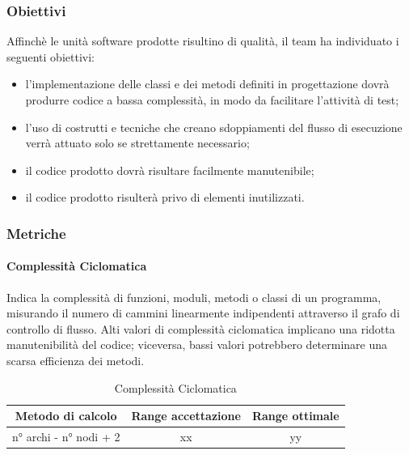 		\subsubsection{Obiettivi}
		Affinchè le unità software prodotte risultino di qualità, il team ha individuato i seguenti obiettivi:
		\begin{itemize}
			\item l’implementazione delle classi e dei metodi definiti in progettazione dovrà produrre codice a bassa complessità, in modo da facilitare l'attività di test;
			\item l’uso di costrutti e tecniche che creano sdoppiamenti del flusso di esecuzione verrà attuato solo se strettamente necessario;
			\item il codice prodotto dovrà risultare facilmente manutenibile;
			\item il codice prodotto risulterà privo di elementi inutilizzati.
		\end{itemize}
		
		\subsubsection{Metriche}
			\paragraph{Complessità Ciclomatica}
			Indica la complessità di funzioni, moduli, metodi o classi di un programma, misurando il numero
			di cammini linearmente indipendenti attraverso il grafo di controllo di flusso.
			Alti valori di complessità ciclomatica implicano una ridotta manutenibilità del codice; viceversa, bassi valori potrebbero determinare una scarsa efficienza dei metodi.
			\begin{table}[H]
				\begin{center}
					\begin{tabular}{|c|c|c|}
						\hline
						\textbf{Metodo di calcolo} & \textbf{Range accettazione} & \textbf{Range ottimale} \\
						\hline
						n° archi - n° nodi + 2 & xx  & yy \\
						\hline
					\end{tabular}
				\end{center}
				\caption{Complessità Ciclomatica}
			\end{table}
			
